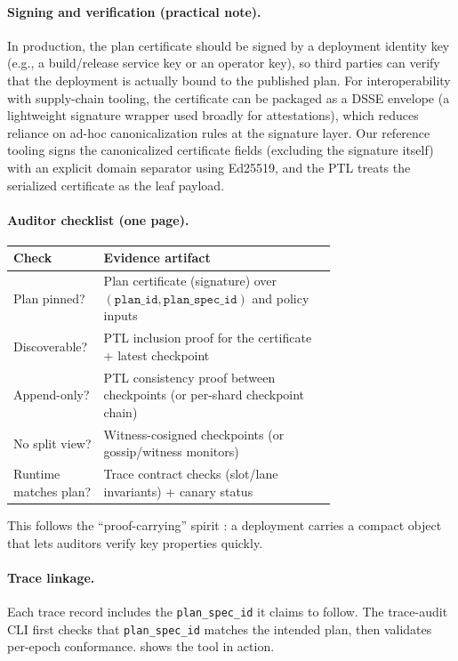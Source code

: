 \documentclass[11pt]{article}
\begin{document}
\paragraph{Signing and verification (practical note).}
In production, the plan certificate should be signed by a deployment identity key (e.g., a build/release service key or an operator key), so third parties can verify that the deployment is actually bound to the published plan.
For interoperability with supply-chain tooling, the certificate can be packaged as a DSSE envelope (a lightweight signature wrapper used broadly for attestations), which reduces reliance on ad-hoc canonicalization rules at the signature layer.\cite{dsseSpec,slsaAttestationModelV12}
Our reference tooling signs the canonicalized certificate fields (excluding the signature itself) with an explicit domain separator using Ed25519, and the PTL treats the serialized certificate as the leaf payload.


\paragraph{Auditor checklist (one page).}
\begin{center}
\begin{tabular}{@{}l >{\raggedright\arraybackslash}p{0.72\linewidth}@{}}
\toprule
Check & Evidence artifact \\
\midrule
Plan pinned? & Plan certificate (signature) over $(\texttt{plan\_id},\texttt{plan\_spec\_id})$ and policy inputs \\
Discoverable? & PTL inclusion proof for the certificate + latest checkpoint \\
Append-only? & PTL consistency proof between checkpoints (or per-shard checkpoint chain) \\
No split view? & Witness-cosigned checkpoints (or gossip/witness monitors) \\
Runtime matches plan? & Trace contract checks (slot/lane invariants) + canary status \\
\bottomrule
\end{tabular}
\end{center}

This follows the ``proof-carrying'' spirit \cite{neculaPCC97}: a deployment carries a compact object that lets auditors verify key properties quickly.

\paragraph{Trace linkage.}
Each trace record includes the \texttt{plan\_spec\_id} it claims to follow.
The trace-audit CLI first checks that \texttt{plan\_spec\_id} matches the intended plan, then validates per-epoch conformance.
 shows the tool in action.
\end{document}
